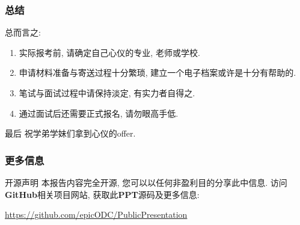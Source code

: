\documentclass[Blue,dvipsnames]{beamer}
\begin{document}
    \begin{frame}
      \frametitle{总结}
      总而言之:
        \begin{enumerate}[label=--]
          \item 实际报考前, 请确定自己心仪的专业, 老师或学校.
          \item 申请材料准备与寄送过程十分繁琐, 建立一个电子档案或许是十分有帮助的.
          \item 笔试与面试过程中请保持淡定, 有实力者自得之.
          \item 通过面试后还需要正式报名, 请勿眼高手低.
        \end{enumerate}
        {
          \begin{block}{\small{最后}}
            祝学弟学妹们拿到心仪的offer.
          \end{block}
          }

      \end{frame}

    \begin{frame}
      \frametitle{更多信息}
      \begin{block}{开源声明}
        本报告内容完全开源, 您可以以任何非盈利目的分享此中信息. 访问\textbf{GitHub}相关项目网站, 获取此\textbf{PPT}源码及更多信息:
        
        \Large\url{https://github.com/epicODC/PublicPresentation}
      \end{block}

    \end{frame}
  
\end{document}
